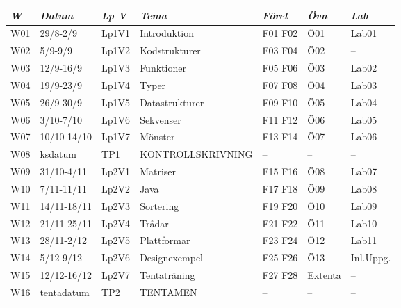 \begin{tabular}{l|l|l|l|l|l|l}
\textit{W} & \textit{Datum} & \textit{Lp V} & \textit{Tema} & \textit{Förel} & \textit{Övn} & \textit{Lab} \\ \hline \hline
W01 & 29/8-2/9    & Lp1V1 & Introduktion      & F01 F02 & Ö01     & Lab01     \\
W02 & 5/9-9/9     & Lp1V2 & Kodstrukturer     & F03 F04 & Ö02     & --        \\
W03 & 12/9-16/9   & Lp1V3 & Funktioner        & F05 F06 & Ö03     & Lab02     \\
W04 & 19/9-23/9   & Lp1V4 & Typer             & F07 F08 & Ö04     & Lab03     \\
W05 & 26/9-30/9   & Lp1V5 & Datastrukturer    & F09 F10 & Ö05     & Lab04     \\
W06 & 3/10-7/10   & Lp1V6 & Sekvenser         & F11 F12 & Ö06     & Lab05     \\
W07 & 10/10-14/10 & Lp1V7 & Mönster           & F13 F14 & Ö07     & Lab06     \\
W08 & ksdatum     & TP1   & KONTROLLSKRIVNING & --      & --      & --        \\
W09 & 31/10-4/11  & Lp2V1 & Matriser          & F15 F16 & Ö08     & Lab07     \\
W10 & 7/11-11/11  & Lp2V2 & Java              & F17 F18 & Ö09     & Lab08     \\
W11 & 14/11-18/11 & Lp2V3 & Sortering         & F19 F20 & Ö10     & Lab09     \\
W12 & 21/11-25/11 & Lp2V4 & Trådar            & F21 F22 & Ö11     & Lab10     \\
W13 & 28/11-2/12  & Lp2V5 & Plattformar       & F23 F24 & Ö12     & Lab11     \\
W14 & 5/12-9/12   & Lp2V6 & Designexempel     & F25 F26 & Ö13     & Inl.Uppg. \\
W15 & 12/12-16/12 & Lp2V7 & Tentaträning      & F27 F28 & Extenta & --        \\
W16 & tentadatum  & TP2   & TENTAMEN          & --      & --      & --        \\
\end{tabular}

